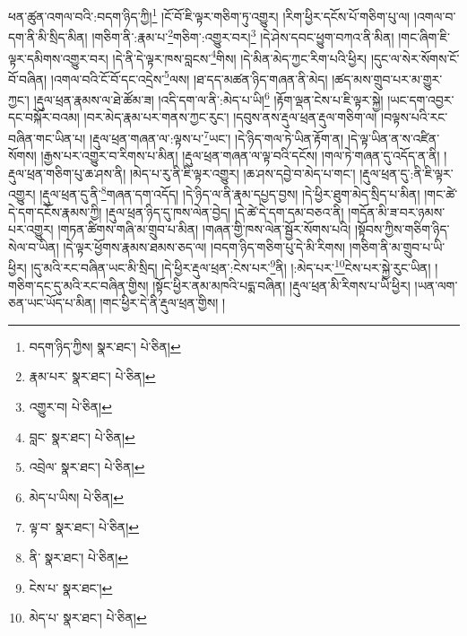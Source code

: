 ཕན་ཚུན་འགལ་བའི་:བདག་ཉིད་ཀྱི།\footnote{བདག་ཉིད་ཀྱིས།  སྣར་ཐང་།  པེ་ཅིན། } །ངོ་བོ་ཇི་ལྟར་གཅིག་ཏུ་འགྱུར། །རིག་ཕྱིར་དངོས་པོ་གཅིག་པུ་ལ། །འགལ་བ་དག་ནི་མི་སྲིད་མིན། །གཅིག་ནི་:རྣམ་པ་\footnote{རྣམ་པར་  སྣར་ཐང་།  པེ་ཅིན། }གཅིག་:འགྱུར་བར།\footnote{འགྱུར་བ།  པེ་ཅིན། } །དེ་ཤེས་དབང་ཕྱུག་བཀའ་ནི་མིན། །གང་ཞིག་ཇི་ལྟར་དམིགས་འགྱུར་བར། །དེ་ནི་དེ་ལྟར་ཁས་བླངས་\footnote{བླང་  སྣར་ཐང་།  པེ་ཅིན། }གིས། །དེ་མིན་མེད་ཀྱང་རིག་པའི་ཕྱིར། །དུང་ལ་སེར་སོགས་ངོ་བོ་བཞིན། །འགལ་བའི་ངོ་བོ་དང་འདྲེས་\footnote{འབྲེལ་  སྣར་ཐང་།  པེ་ཅིན། }ལས། །ཐ་དད་མཚན་ཉིད་གཞན་ནི་མེད། །ཚད་མས་གྲུབ་པར་མ་གྱུར་ཀྱང་། །རྡུལ་ཕྲན་རྣམས་ལ་ཐེ་ཚོམ་ཟ། །འདི་དག་ལ་ནི་:མེད་པ་ཡི།\footnote{མེད་པ་ཡིས།  པེ་ཅིན། } །རྟོག་ལྡན་ངེས་པ་ཇི་ལྟར་སྐྱེ། །ཡང་དག་འབྱར་དང་བསྐོར་བའམ། །བར་མེད་རྣམ་པར་གནས་ཀྱང་རུང་། །དབུས་ནས་རྡུལ་ཕྲན་རྡུལ་གཅིག་ལ། །བལྟས་པའི་རང་བཞིན་གང་ཡིན་པ། །རྡུལ་ཕྲན་གཞན་ལ་:ལྟས་པ་\footnote{ལྟ་བ་  སྣར་ཐང་།  པེ་ཅིན། }ཡང་། །དེ་ཉིད་གལ་ཏེ་ཡིན་རྟོག་ན། །དེ་ལྟ་ཡིན་ན་ས་འཛིན་སོགས། །རྒྱས་པར་འགྱུར་བ་རིགས་པ་མིན། །རྡུལ་ཕྲན་གཞན་ལ་ལྟ་བའི་དངོས། །གལ་ཏེ་གཞན་དུ་འདོད་ན་ནི། །རྡུལ་ཕྲན་གཅིག་པུ་ཆ་ཤས་ནི། །མེད་པ་རུ་ནི་ཇི་ལྟར་འགྱུར། །ཆ་ཤས་དབྱེ་བ་མེད་པ་གང་། །རྡུལ་ཕྲན་དུ་:ནི་ཇི་ལྟར་འགྱུར། །རྡུལ་ཕྲན་དུ་ནི་\footnote{ནི་  སྣར་ཐང་།  པེ་ཅིན། }གཞན་དག་འདོད། །དེ་ཉིད་ལ་ནི་རྣམ་དཔྱད་བྱས། །དེ་ཕྱིར་ཐུག་མེད་སྲིད་པ་མིན། །གང་ཚེ་དེ་དག་དངོས་རྣམས་ཀྱི། །རྡུལ་ཕྲན་ཉིད་དུ་ཁས་ལེན་བྱེད། །དེ་ཚེ་དེ་དག་དམ་བཅའ་ནི། །གདོན་མི་ཟ་བར་ཉམས་པར་འགྱུར། །གཏན་ཚིགས་གཞི་མ་གྲུབ་པ་མིན། །གཞན་གྱི་ཁས་ལེན་སྦྱོར་སོགས་པའི། །སྟོབས་ཀྱིས་གཅིག་ཉིད་སེལ་བ་ཡིན། །དེ་ལྟར་ཕྱོགས་རྣམས་ཐམས་ཅད་ལ། །བདག་ཉིད་གཅིག་པུ་དེ་མི་རིགས། །གཅིག་ནི་མ་གྲུབ་པ་ཡི་ཕྱིར། །དུ་མའི་རང་བཞིན་ཡང་མི་སྲིད། །དེ་ཕྱིར་རྡུལ་ཕྲན་:ངེས་པར་\footnote{ངེས་པ་  སྣར་ཐང་། }ནི། །:མེད་པར་\footnote{མེད་པ་  སྣར་ཐང་།  པེ་ཅིན། }ངེས་པར་སྐྱེ་རུང་ཡིན། །གཅིག་དང་དུ་མའི་རང་བཞིན་གྱིས། །སྟོང་ཕྱིར་ནམ་མཁའི་པདྨ་བཞིན། །རྡུལ་ཕྲན་མི་རིགས་པ་ཡི་ཕྱིར། །ཡན་ལག་ཅན་ཡང་ཡོད་པ་མིན། །གང་ཕྱིར་དེ་ནི་རྡུལ་ཕྲན་གྱིས། །
